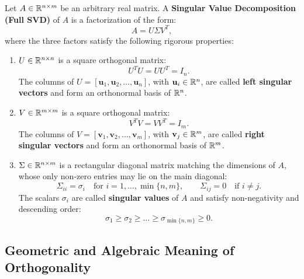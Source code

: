 \begin{definition}
\label{def:full-svd-en}
Let $A \in \mathbb{R}^{n \times m}$ be an arbitrary real matrix. A \textbf{Singular Value Decomposition (Full SVD)} of $A$ is a factorization of the form:
\begin{equation}
    A = U \Sigma V^T,
\end{equation}
where the three factors satisfy the following rigorous properties:
\begin{enumerate}
    \item $U \in \mathbb{R}^{n \times n}$ is a square orthogonal matrix:
    \begin{equation}
        U^T U = U U^T = I_n.
    \end{equation}
    The columns of $U = [\mathbf{u}_1, \mathbf{u}_2, \dots, \mathbf{u}_n]$, with $\mathbf{u}_i \in \mathbb{R}^n$, are called \textbf{left singular vectors} and form an orthonormal basis of $\mathbb{R}^n$.

    \item $V \in \mathbb{R}^{m \times m}$ is a square orthogonal matrix:
    \begin{equation}
        V^T V = V V^T = I_m.
    \end{equation}
    The columns of $V = [\mathbf{v}_1, \mathbf{v}_2, \dots, \mathbf{v}_m]$, with $\mathbf{v}_j \in \mathbb{R}^m$, are called \textbf{right singular vectors} and form an orthonormal basis of $\mathbb{R}^m$.

    \item $\Sigma \in \mathbb{R}^{n \times m}$ is a rectangular diagonal matrix matching the dimensions of $A$, whose only non-zero entries may lie on the main diagonal:
    \begin{equation}
        \Sigma_{ii} = \sigma_i \quad \text{for } i = 1, \dots, \min\{n, m\}, \qquad \Sigma_{ij} = 0 \quad \text{if } i \neq j.
    \end{equation}
    The scalars $\sigma_i$ are called \textbf{singular values} of $A$ and satisfy non-negativity and descending order:
    \begin{equation}
        \sigma_1 \ge \sigma_2 \ge \dots \ge \sigma_{\min\{n, m\}} \ge 0.
    \end{equation}
\end{enumerate}
\end{definition}

\subsection{Geometric and Algebraic Meaning of Orthogonality}

